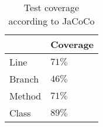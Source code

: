 \documentclass[]{article}
\begin{document}
\begin{table}[]
	\begin{center}
		\begin{tabular}{|l||l|}
			\hline
			&  Coverage \\ \hline\hline
			Line	& $71\%$   \\
			Branch  & $46\%$ \\
			Method	& $71\%$  \\ 
			Class	& $89\%$  \\
			\hline
		\end{tabular}
		\caption{Test coverage according to JaCoCo}
	\end{center}
\end{table}
\end{document}

